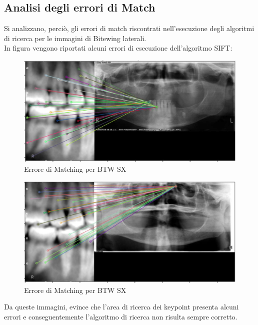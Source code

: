 \documentclass[12pt,a4paper,openright,twoside]{book}
\begin{document}
\subsection{Analisi degli errori di Match}
Si analizzano, perciò, gli errori di match riscontrati nell'esecuzione degli algoritmi di ricerca per le immagini di Bitewing laterali.\\
In figura vengono riportati alcuni errori di esecuzione dell'algoritmo SIFT:
\begin{figure}[H]
	\centering
	\includegraphics[width=13cm]{figures/matcherr.pdf}
   	\caption{Errore di Matching per BTW SX}
	\label{fig:matcherr}
\end{figure}
\begin{figure}[H]
	\centering
	\includegraphics[width=13cm]{figures/matcherr2.pdf}
    	\caption{Errore di Matching per BTW SX}
	\label{fig:matcherr2}
\end{figure}

Da queste immagini, evince che l'area di ricerca dei keypoint presenta alcuni errori e conseguentemente l'algoritmo di ricerca non risulta sempre corretto.

\end{document}
